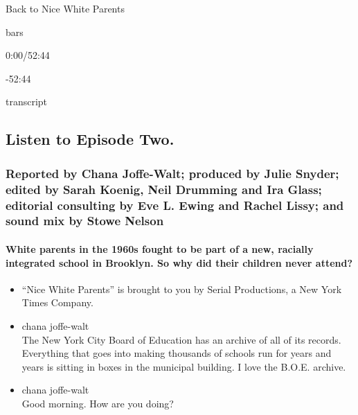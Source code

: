 Back to Nice White Parents

bars

0:00/52:44

-52:44

transcript

\hypertarget{listen-to-episode-two-1}{%
\subsection{Listen to Episode Two.}\label{listen-to-episode-two-1}}

\hypertarget{reported-by-chana-joffe-walt-produced-by-julie-snyder-edited-by-sarah-koenig-neil-drumming-and-ira-glass-editorial-consulting-by-eve-l-ewing-and-rachel-lissy-and-sound-mix-by-stowe-nelson-2}{%
\subsubsection{Reported by Chana Joffe-Walt; produced by Julie Snyder;
edited by Sarah Koenig, Neil Drumming and Ira Glass; editorial
consulting by Eve L. Ewing and Rachel Lissy; and sound mix by Stowe
Nelson}\label{reported-by-chana-joffe-walt-produced-by-julie-snyder-edited-by-sarah-koenig-neil-drumming-and-ira-glass-editorial-consulting-by-eve-l-ewing-and-rachel-lissy-and-sound-mix-by-stowe-nelson-2}}

\hypertarget{white-parents-in-the-1960s-fought-to-be-part-of-a-new-racially-integrated-school-in-brooklyn-so-why-did-their-children-never-attend}{%
\paragraph{White parents in the 1960s fought to be part of a new,
racially integrated school in Brooklyn. So why did their children never
attend?}\label{white-parents-in-the-1960s-fought-to-be-part-of-a-new-racially-integrated-school-in-brooklyn-so-why-did-their-children-never-attend}}

\begin{itemize}
\item
  ``Nice White Parents'' is brought to you by Serial Productions, a New
  York Times Company.
\item
  chana joffe-walt\\
  The New York City Board of Education has an archive of all of its
  records. Everything that goes into making thousands of schools run for
  years and years is sitting in boxes in the municipal building. I love
  the B.O.E. archive.
\item
  chana joffe-walt\\
  Good morning. How are you doing?
\end{itemize}

